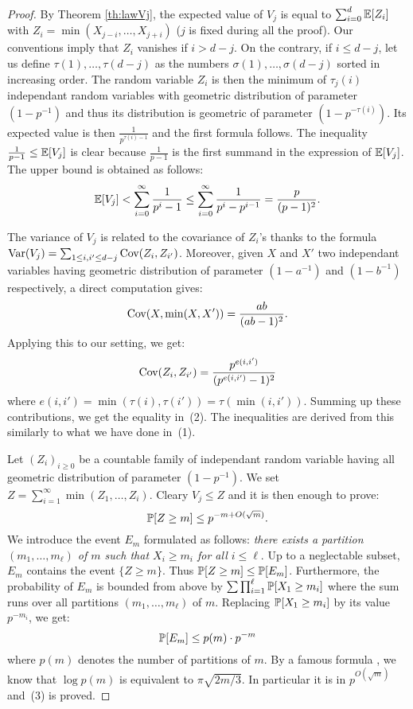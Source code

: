 \documentclass{sig-alternate}
\begin{document}
\begin{proof}
By Theorem \ref{th:lawVj}, the expected value of $V_j$ is equal to 
$\sum_{i=0}^d \E[Z_i]$ with $Z_i = \min(X_{j-i}, \ldots, X_{j+i})$ ($j$ 
is fixed during all the proof). Our conventions imply that $Z_i$ 
vanishes if $i > d-j$. On the contrary, if $i \leq d-j$, let us define 
$\tau(1), \ldots, \tau(d-j)$ as the numbers $\sigma(1), \ldots, 
\sigma(d-j)$ sorted in increasing order. The random variable $Z_i$ 
is then the minimum of $\tau_j(i)$ independant random variables with 
geometric distribution of parameter $(1 - p^{-1})$ and thus its 
distribution is geometric of parameter $(1 - p^{-\tau(i)})$.
Its expected value is then $\frac 1 {p^{\tau(i) - 1}}$ and the first
formula follows. The inequality $\frac 1 {p-1} \leq \E[V_j]$ is clear
because $\frac 1 {p-1}$ is the first summand in the expression of 
$\E[V_j]$. The upper bound is obtained as follows:
$$\E[V_j] < \sum_{i=0}^\infty \frac 1{p^i - 1}
\leq \sum_{i=0}^\infty \frac 1{p^i - p^{i-1}} = \frac p {(p-1)^2}.$$

The variance of $V_j$ is related to the covariance 
of $Z_i$'s thanks to the formula
$\Var(V_j) = \sum_{1 \leq i,i' \leq d-j} \Cov(Z_i, Z_{i'})$.
Moreover, given $X$ and $X'$ two independant variables having geometric
distribution of parameter $(1 - a^{-1})$ and $(1 - b^{-1})$ respectively,
a direct computation gives:
$$\Cov(X, \min(X,X')) = \frac{ab}{(ab-1)^2}.$$
Applying this to our setting, we get:
$$\Cov(Z_i, Z_{i'}) = \frac{p^{e(i,i')}}{(p^{e(i,i')}-1)^2}$$
where $e(i,i') = \min(\tau(i), \tau(i')) = \tau(\min(i,i'))$. Summing
up these contributions, we get the equality in~(2). The inequalities
are derived from this similarly to what we have done in~(1).

Let $(Z_i)_{i \geq 0}$ be a countable family 
of independant random variable having all geometric distribution of 
parameter $(1 - p^{-1})$. We set $Z = \sum_{i=1}^\infty \min(Z_1, \ldots, 
Z_i)$. Cleary $V_j \leq Z$ and it is then enough to prove:
$$\P[Z \geq m] \leq p^{-m + O(\sqrt m)}.$$
We introduce the event $E_m$ formulated as follows:
\emph{there exists a partition $(m_1, \ldots, m_\ell)$ of $m$ such that $X_i 
\geq m_i$ for all $i \leq \ell$}.
Up to a neglectable subset, $E_m$ contains the event $\{ Z \geq m\}$.
Thus $\P[Z \geq m] \leq \P[E_m]$. Furthermore, the probability of $E_m$
is bounded from above by $\sum \prod_{i=1}^\ell \P[X_1 \geq m_i]$ where
the sum runs over all partitions $(m_1, \ldots, m_\ell)$ of $m$. 
Replacing $\P[X_1 \geq m_i]$ by its value $p^{-m_i}$, we get:
$$\P[E_m] \leq p(m) \cdot p^{-m}$$
where $p(m)$ denotes the number of partitions of $m$. By a famous 
formula \cite{andrews}, we know that $\log p(m)$ is equivalent to $\pi 
\sqrt{2m/3}$. In particular it is in $p^{O(\sqrt m)}$ and~(3) is proved.


\end{proof}
\end{document}
